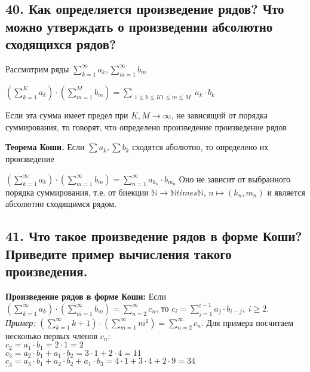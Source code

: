 \documentclass[a4paper, fleqn]{article}
\begin{document}
    \subsection*{40. Как определяется произведение рядов? Что можно утверждать о произведении абсолютно
    сходящихся рядов?}
    Рассмотрим ряды $\sum_{k=1}^\infty a_k, \sum_{m=1}^{\infty} b_m$
        
    $\displaystyle 
        \left(\sum_{k=1}^K a_k \right) \cdot \left(\sum_{m=1}^M b_m \right) = \sum_{\substack{1 \leq k \leq K
        1 \leq m \leq M}}a_k \cdot b_k
    $
    
    Если эта сумма имеет предел при $K, M \to \infty$, не зависящий от порядка
    суммирования, то говорят, что определено произведение произведение рядов

    \textbf{Теорема Коши.}
    Если $\sum a_k, \sum b_k$ сходятся аболютно, то определено их произведение
    
    $\left(\sum_{k=1}^\infty a_k \right) \cdot \left(\sum_{m=1}^\infty b_m \right) = 
    \sum_{n=1}^{\infty} a_{k_n} \cdot b_{m_n}$
    Оно не зависит от выбранного порядка суммирования, т.е. от биекции $\mathbb{N} \to \mathbb{N}times\mathbb{N}$,
    $n \mapsto (k_n, m_n)$ и является абсолютно сходящимся рядом.
    
    \subsection*{41. Что такое произведение рядов в форме Коши? Приведите пример вычисления такого произведения.}
    \textbf{Произведение рядов в форме Коши:} Если $\left(\sum_{k=1}^{\infty} a_k\right) \cdot \left(\sum_{m=1}^{\infty} b_m \right) = \sum_{n=2}^{\infty} c_n$, то $c_i = \sum\limits_{j = 1}^{i - 1} a_j \cdot b_{i - j}, \; i \geq 2$. \\
    \textit{Пример:} $\left(\sum\limits_{k=1}^{\infty} k + 1 \right) \cdot \left( \sum\limits_{m = 1}^{\infty} m^2 \right) = \sum\limits_{n = 2}^{\infty} c_n$. Для примера посчитаем несколько первых членов $c_n$: \\
    $c_2 = a_1 \cdot b_1 = 2 \cdot 1 = 2$\\
    $c_3 = a_2 \cdot b_1 + a_1 \cdot b_2 = 3 \cdot 1 + 2 \cdot 4 = 11$ \\
    $c_4 = a_3 \cdot b_1 + a_2 \cdot b_2 + a_1 \cdot b_3 = 4 \cdot 1 + 3 \cdot 4 + 2 \cdot 9 = 34$ \\
    $\dots$ \\

        
\end{document}
